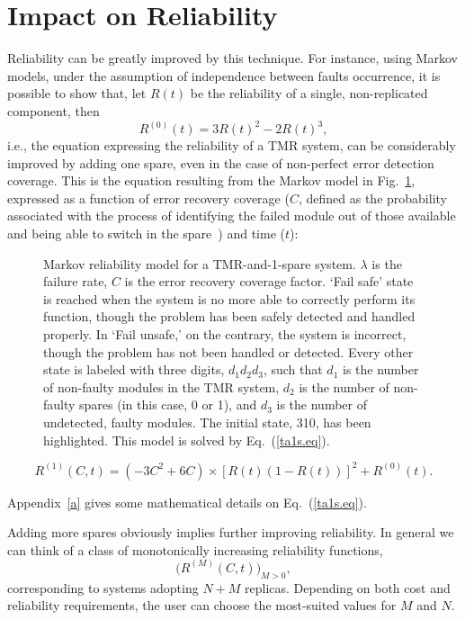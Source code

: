\documentclass[11pt]{article}
\begin{document}
\section{Impact on Reliability}\label{ior}
Reliability can be greatly improved by this technique. For instance,
using Markov models, under the assumption of independence between faults occurrence,
it is possible to show that, let $R(t)$ be the reliability
of a single, non-replicated component, then
\begin{equation}
R^{(0)}(t) = 3R(t)^2 -2R(t)^3,\label{tmr.eq}
\end{equation}
i.e., the equation expressing the reliability of a TMR system, can be
considerably improved by adding one spare, even in the case of non-perfect
error detection coverage. 
This is the equation resulting from the Markov model in 
Fig.~\ref{markov}, expressed as a function of error recovery coverage ($C$,
defined as the probability associated with the process of identifying the failed module
out of those available and being able to switch in the spare~\cite{John89a}) and time ($t$):

\begin{figure}
\centerline{}
\caption{Markov reliability model for a TMR-and-1-spare system. $\lambda$ is the failure rate, $C$ is
the error recovery coverage factor.
`Fail safe' state is
reached when the system is no more able to correctly perform its function, though the problem has been 
safely detected and handled properly. In `Fail unsafe,' on the contrary, the system is incorrect, though
the problem has not been handled or detected. 
Every other state is labeled with three digits, $d_1d_2d_3$, such that
$d_1$ is the number of non-faulty modules in the TMR system, $d_2$ is the number of non-faulty spares
(in this case, 0 or 1), and $d_3$ is the number of undetected, faulty modules. The
initial state, 310, has been highlighted. 
This model is solved by Eq.~(\ref{ta1s.eq}).}
\label{markov}
\end{figure}

\begin{equation}
R^{(1)}(C, t) = (-3C^2 + 6C ) \times [ R(t) (1-R(t)) ]^2 + R^{(0)}(t).\label{ta1s.eq}
\end{equation}

\noindent
Appendix~\ref{a} gives some mathematical details on Eq.~(\ref{ta1s.eq}).

Adding more spares obviously implies further improving reliability. In general
we can think of a class of monotonically increasing reliability functions,
\begin{equation}
\big( R^{(M)}(C, t) \big)_{M>0},
\end{equation}
corresponding to systems adopting $N+M$ replicas.
Depending on both cost and reliability requirements,
the user can choose the most-suited values for $M$ and $N$.
\end{document}
